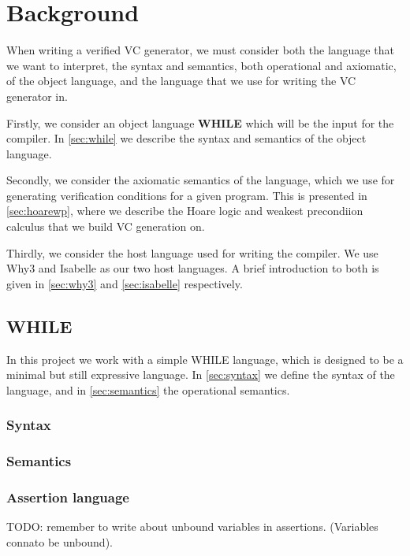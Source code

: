 \section{Background}
When writing a verified VC generator, we must consider both the language that we want to interpret, the syntax and semantics, both operational and axiomatic, of the object language, and the language that we use for writing the VC generator in.

Firstly, we consider an object language \textbf{WHILE} which will be the input for the compiler.
In \autoref{sec:while} we describe the syntax and semantics of the object language.

Secondly, we consider the axiomatic semantics of the language, which we use for generating verification conditions for a given program. This is presented in \autoref{sec:hoarewp}, where we describe the Hoare logic and weakest precondiion calculus that we build VC generation on.

Thirdly, we consider the host language used for writing the compiler.
We use Why3 and Isabelle as our two host languages. A brief introduction to both is given in \autoref{sec:why3} and \autoref{sec:isabelle} respectively.

\subsection{WHILE}\label{sec:while}
In this project we work with a simple WHILE language, which is designed to be a minimal but still expressive language.
In \autoref{sec:syntax} we define the syntax of the language, and in \autoref{sec:semantics} the operational semantics.

\subsubsection{Syntax}\label{sec:syntax}

\subsubsection{Semantics}\label{sec:semantics}


\subsubsection{Assertion language}\label{sec:assert}
TODO: remember to write about unbound variables in assertions. (Variables connato be unbound).


